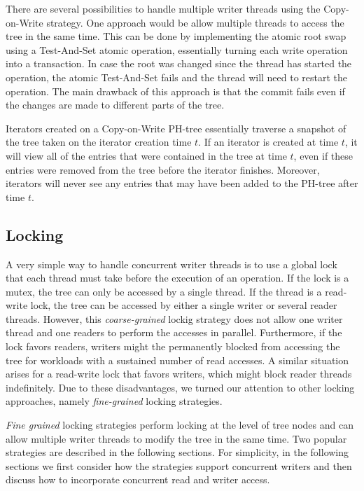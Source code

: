 \documentclass[11pt,a4paper]{globis-book}
\begin{document}
There are several possibilities to handle multiple writer threads using the Copy-on-Write strategy. One approach would be allow multiple threads to access the tree in the same time. This can be done by implementing the atomic root swap using a Test-And-Set atomic operation, essentially turning each write operation into a transaction. In case the root was changed since the thread has started the operation, the atomic Test-And-Set fails and the thread will need to restart the operation. The main drawback of this approach is that the commit fails even if the changes are made to different parts of the tree.

Iterators created on a Copy-on-Write PH-tree essentially traverse a snapshot of the tree taken on the iterator creation time $t$. If an iterator is created at time $t$, it will view all of the entries that were contained in the tree at time $t$, even if these entries were removed from the tree before the iterator finishes. Moreover, iterators will never see any entries that may have been added to the PH-tree after time $t$.

\subsection{Locking}

A very simple way to handle concurrent writer threads is to use a global lock that each thread must take before the execution of an operation. If the lock is a mutex, the tree can only be accessed by a single thread. If the thread is a read-write lock, the tree can be accessed by either a single writer or several reader threads. However, this \textit{coarse-grained} lockig strategy does not allow one writer thread and one readers to perform the accesses in parallel. Furthermore, if the lock favors readers, writers might the permanently blocked from accessing the tree for workloads with a sustained number of read accesses. A similar situation arises for a read-write lock that favors writers, which might block reader threads indefinitely. Due to these disadvantages, we turned our attention to other locking approaches, namely \textit{fine-grained} locking strategies.  

\textit{Fine grained} locking strategies perform locking at the level of tree nodes and can allow multiple writer threads to modify the tree in the same time. Two popular strategies are described in the following sections. For simplicity, in the following sections we first consider how the strategies support concurrent writers and then discuss how to incorporate concurrent read and writer access.  
\end{document}
